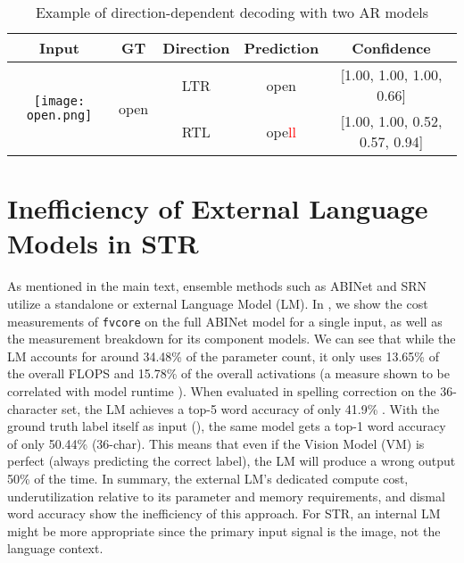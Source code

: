 \begin{table}[htbp]
    \centering
    \setlength{\tabcolsep}{5pt}
    \caption{Example of direction-dependent decoding with two AR models}
    \label{tab:direction-dependent}
    \begin{tabular}{c c | c c c}
        \toprule
        Input & GT & Direction & Prediction & Confidence \\
        \midrule
        \multirow{2}{*}{\texttt{[image: open.png]}} & \multirow{2}{*}{open} & LTR & open & [1.00, 1.00, 1.00, 0.66] \\
        & & RTL & ope\textcolor{red}{ll} & [1.00, 1.00, 0.52, 0.57, 0.94] \\
        \bottomrule
    \end{tabular}
\end{table}


\section{Inefficiency of External Language Models in STR}

As mentioned in the main text, ensemble methods such as ABINet \cite{Fang_2021_CVPR} and SRN \cite{yu2020towards} utilize a standalone or external Language Model (LM). In , we show the cost measurements of \texttt{fvcore} on the full ABINet model for a single input, as well as the measurement breakdown for its component models. We can see that while the LM accounts for around 34.48\% of the parameter count, it only uses 13.65\% of the overall FLOPS and 15.78\% of the overall activations (a measure shown to be correlated with model runtime \cite{dollar2021fast,xiao2021early}). When evaluated in spelling correction on the 36-character set, the LM achieves a top-5 word accuracy of only 41.9\% \cite{Fang_2021_CVPR}. With the ground truth label itself as input (), the same model gets a top-1 word accuracy of only 50.44\% (36-char). This means that even if the Vision Model (VM) is perfect (always predicting the correct label), the LM will produce a wrong output 50\% of the time. In summary, the external LM's dedicated compute cost, underutilization relative to its parameter and memory requirements, and dismal word accuracy show the inefficiency of this approach. For STR, an internal LM might be more appropriate since the primary input signal is the image, not the language context.

